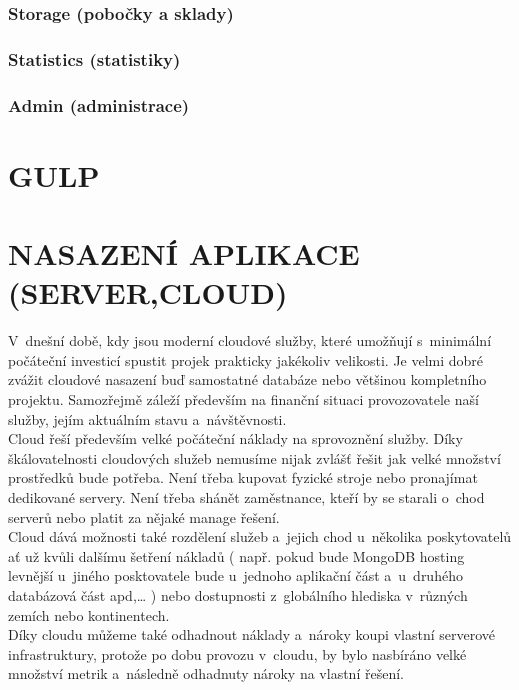 \documentclass[a4paper,12pt,twoside,BCOR=10mm]{article}
\newcommand{\upc}[1]{\uppercase{#1}} %
\begin{document}
\subsubsection{Storage (pobočky a sklady)}\label{sec:storage}
\subsubsection{Statistics (statistiky)}\label{sec:stats}
\subsubsection{Admin (administrace)}\label{sec:admin}


\section{\upc{Gulp}}

\section{\upc{Nasazení aplikace (server,cloud)}}
V~dnešní době, kdy jsou moderní cloudové služby, které umožňují s~minimální počáteční investicí spustit projek prakticky jakékoliv velikosti. Je velmi dobré zvážit cloudové nasazení buď samostatné databáze nebo většinou kompletního projektu. Samozřejmě záleží především na finanční situaci provozovatele naší služby, jejím aktuálním stavu a~návštěvnosti.\\

Cloud řeší především velké počáteční náklady na sprovoznění služby. Díky škálovatelnosti cloudových služeb nemusíme nijak zvlášť řešit jak velké množství prostředků bude potřeba. Není třeba kupovat fyzické stroje nebo pronajímat dedikované servery. Není třeba shánět zaměstnance, kteří by se starali o~chod serverů nebo platit za nějaké manage řešení.\\

Cloud dává možnosti také rozdělení služeb a~jejich chod u~několika poskytovatelů ať už kvůli dalšímu šetření nákladů ( např. pokud bude MongoDB hosting levnější u~jiného posktovatele bude u~jednoho aplikační část a~u~druhého databázová část apd,… ) nebo dostupnosti z~globálního hlediska v~různých zemích nebo kontinentech.\\

Díky cloudu můžeme také odhadnout náklady a~nároky koupi vlastní serverové infrastruktury, protože po dobu provozu v~cloudu, by bylo nasbíráno velké množství metrik a~následně odhadnuty nároky na vlastní řešení.\\
\end{document}
